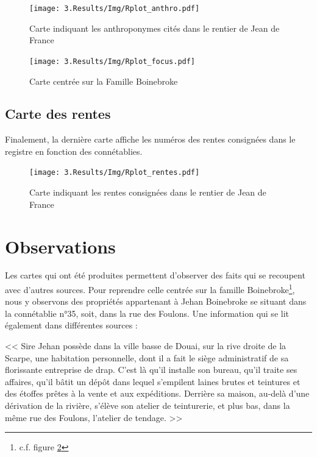 \begin{figure}
    \centering
    \texttt{[image: 3.Results/Img/Rplot\_anthro.pdf]}
    \caption{Carte indiquant les anthroponymes cités dans le rentier de Jean de France}
    \label{fig:mapAnthro}
\end{figure}

\begin{figure}
    \centering
    \texttt{[image: 3.Results/Img/Rplot\_focus.pdf]}
    \caption{Carte centrée sur la Famille Boinebroke}
    \label{fig:mapFocus}
\end{figure}

\subsection{Carte des rentes}
Finalement, la dernière carte affiche les numéros des rentes consignées dans le registre en fonction des connétablies.
\begin{figure}
    \centering
    \texttt{[image: 3.Results/Img/Rplot\_rentes.pdf]}
    \caption{Carte indiquant les rentes consignées dans le rentier de Jean de France}
    \label{fig:mapRente}
\end{figure}

\section{Observations}
Les cartes qui ont été produites permettent d'observer des faits  qui se recoupent avec d'autres sources. Pour reprendre celle centrée sur la famille Boinebroke\footnote{c.f. figure \ref{fig:mapFocus}},  nous  y observons des propriétés appartenant à Jehan Boinebroke se situant dans la connétablie n°35, soit, dans la rue des Foulons.
Une information qui se lit également dans différentes sources :
\begin{displayquote}
    << Sire Jehan possède dans la ville basse de Douai, sur la rive droite de la Scarpe, une habitation personnelle, dont il a fait le siège administratif de sa florissante entreprise de drap. C'est là qu'il installe son bureau, qu'il traite ses affaires, qu'il bâtit un dépôt dans lequel s'empilent laines brutes et teintures et des étoffes prêtes à la vente et aux expéditions. Derrière sa maison, au-delà d'une dérivation de la rivière, s'élève son atelier de teinturerie, et plus bas, dans la même rue des Foulons, l'atelier de tendage. >> 
\end{displayquote} 

